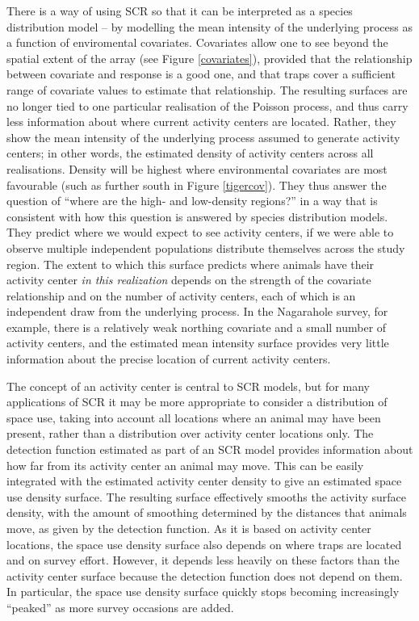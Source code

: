 \documentclass[a4paper,12pt]{article}
\begin{document}
There is a way of using SCR so that it can be interpreted as a species distribution model -- by modelling the mean intensity of the underlying process as a function of enviromental covariates. Covariates allow one to see beyond the spatial extent of the array (see Figure \ref{covariates}), provided that the relationship between covariate and response is a good one, and that traps cover a sufficient range of covariate values to estimate that relationship. The resulting surfaces are no longer tied to one particular realisation of the Poisson process, and thus carry less information about where current activity centers are located. Rather, they show the mean intensity of the underlying process assumed to generate activity centers; in other words, the estimated density of activity centers across all realisations. Density will be highest where environmental covariates are most favourable (such as further south in Figure \ref{tigercov}). They thus answer the question of ``where are the high- and low-density regions?'' in a way that is consistent with how this question is answered by species distribution models. They predict where we would expect to see activity centers, if we were able to observe multiple independent populations distribute themselves across the study region. The extent to which this surface predicts where animals have their activity center {\it in this realization} depends on the strength of the covariate relationship and on the number of activity centers, each of which is an independent draw from the underlying process. In the Nagarahole survey, for example, there is a relatively weak northing covariate and a small number of activity centers, and the estimated mean intensity surface provides very little information about the precise location of current activity centers. 

The concept of an activity center is central to SCR models, but for many applications of SCR it may be more appropriate to consider a distribution of space use, taking into account all locations where an animal may have been present, rather than a distribution over activity center locations only. The detection function estimated as part of an SCR model provides information about how far from its activity center an animal may move. This can be easily integrated with the estimated activity center density to give an estimated space use density surface. The resulting surface effectively smooths the activity surface density, with the amount of smoothing determined by the distances that animals move, as given by the detection function. As it is based on activity center locations, the space use density surface also depends on where traps are located and on survey effort. However, it depends less heavily on these factors than the activity center surface because the detection function does not depend on them. In particular, the space use density surface quickly stops becoming increasingly ``peaked'' as more survey occasions are added.
\end{document}
